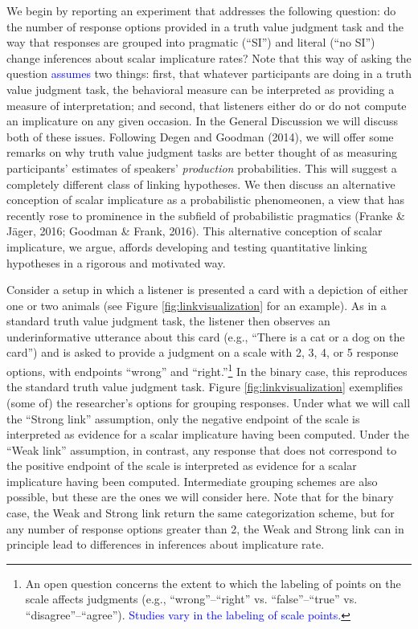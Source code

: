 \documentclass[man]{apa6}
\newcommand{\change}[1]{\textcolor{Blue}{#1}}
\theoremstyle{definition}
\theoremstyle{definition}
\theoremstyle{definition}
\theoremstyle{remark}
\begin{document}
We begin by reporting an experiment that addresses the following
question: do the number of response options provided in a truth value
judgment task and the way that responses are grouped into pragmatic
(\enquote{SI}) and literal (\enquote{no SI}) change inferences about
scalar implicature rates? Note that this way of asking the question
\change{assumes} two things: first, that whatever participants are doing in a
truth value judgment task, the behavioral measure can be interpreted as
providing a measure of interpretation; and second, that listeners either
do or do not compute an implicature on any given occasion. In the
General Discussion we will discuss both of these issues.
Following Degen and Goodman (2014), we will offer some remarks on why
truth value judgment tasks are better thought of as measuring
participants' estimates of speakers' \emph{production} probabilities.
This will suggest a completely different class of linking hypotheses.
We then discuss an alternative conception of scalar implicature as a
probabilistic phenomeonen, a view that has recently rose to prominence
in the subfield of probabilistic pragmatics (Franke \& Jäger, 2016;
Goodman \& Frank, 2016). This alternative conception of scalar
implicature, we argue, affords developing and testing quantitative
linking hypotheses in a rigorous and motivated way.

Consider a setup in which a listener is presented a card with a
depiction of either one or two animals (see Figure
\ref{fig:linkvisualization} for an example). As in a standard truth
value judgment task, the listener then observes an underinformative
utterance about this card (e.g., \enquote{There is a cat or a dog on the
card}) and is asked to provide a judgment on a scale with 2, 3, 4, or 5
response options, with endpoints \enquote{wrong} and
\enquote{right.}\footnote{An open question concerns the extent to which
  the labeling of points on the scale affects judgments (e.g.,
  \enquote{wrong}--\enquote{right} vs. \enquote{false}--\enquote{true}
  vs. \enquote{disagree}--\enquote{agree}). \change{Studies vary in the labeling of scale points.}} In the binary case, this reproduces the standard
truth value judgment task. Figure \ref{fig:linkvisualization}
exemplifies (some of) the researcher's options for grouping responses.
Under what we will call the \enquote{Strong link} assumption, only the
negative endpoint of the scale is interpreted as evidence for a scalar
implicature having been computed. Under the \enquote{Weak link}
assumption, in contrast, any response that does not correspond to the
positive endpoint of the scale is interpreted as evidence for a scalar
implicature having been computed. Intermediate grouping schemes are also
possible, but these are the ones we will consider here. Note that for
the binary case, the Weak and Strong link return the same categorization
scheme, but for any number of response options greater than 2, the Weak
and Strong link can in principle lead to differences in inferences about
implicature rate.
\end{document}
